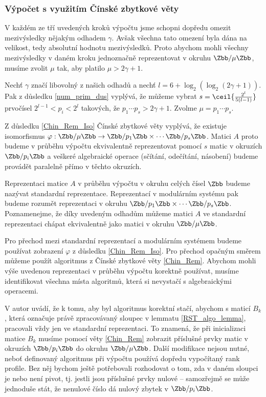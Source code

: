 \subsubsection{Výpočet s využitím Čínské zbytkové věty}

V každém ze tří uvedených kroků výpočtu jsme schopni dopředu omezit mezivýsledky
nějakým odhadem $ \gamma $. Avšak všechna tato omezení byla dána na velikost,
tedy absolutní hodnotu mezivýsledků. Proto abychom mohli všechny mezivýsledky 
v daném kroku jednoznačně reprezentovat v okruhu $ \Zbb / \mu \Zbb $, musíme 
zvolit $ \mu $ tak, aby platilo $ \mu > 2 \gamma + 1 $.

Nechť $ \gamma $ značí libovolný z našich odhadů a nechť 
$ l = 6 + \log_2(\log_2(2 \gamma + 1)) $. Pak z důsledku \ref{num_prim_dus} 
vyplývá, že můžeme vybrat $ s = \ceil{\frac{2^{l}}{5 (l - 1)}} $ prvočísel 
$ 2^{l - 1} < p_i < 2^l $ takových, že $ p_1 \cdots p_s > 2 \gamma + 1 $. Zvolme 
$ \mu = p_1 \cdots p_s $. 

Z důsledku \ref{Chin_Rem_Iso} Čínské zbytkové věty vyplývá, že existuje 
isomorfismus 
$ \varphi : \Zbb / \mu \Zbb \rightarrow \Zbb / p_1 \Zbb \times \cdots \Zbb / p_s \Zbb $.
Matici $ A $ proto budeme v průběhu výpočtu ekvivalentně reprezentovat pomocí
$ s $ matic v okruzích $ \Zbb / p_i \Zbb $ a veškeré algebraické operace 
(sčítání, odečítání, násobení) budeme provádět paralelně přímo v těchto okruzích.

Reprezentaci matice $ A $ v průběhu výpočtu v okruhu celých čísel $ \Zbb $ budeme
nazývat standardní reprezentace. Reprezentací v modulárním systému pak budeme 
rozumět reprezentaci v okruhu $ \Zbb / p_1 \Zbb \times \cdots \Zbb / p_s \Zbb $.
Poznamenejme, že díky uvedeným odhadům můžeme matici $ A $ ve standardní 
reprezentaci chápat ekvivalentně jako matici v okruhu $ \Zbb / \mu \Zbb $. 

Pro přechod mezi standardní reprezentací a modulárním systémem budeme používat
zobrazení $ \varphi $ z důsledku \ref{Chin_Rem_Iso}. Pro přechod opačným směrem
můžeme použít algoritmus z Čínské zbytkové věty \ref{Chin_Rem}.
Abychom mohli výše uvedenou reprezentaci v průběhu výpočtu korektně používat, 
musíme identifikovat všechna místa algoritmů, která si nevystačí s algebraickými 
operacemi. 

V \cite[Theorem 16]{triang} autor uvádí, že k tomu, aby byl algoritmus
korektní stačí, abychom s maticí $ B_k $, která označuje právě zpracovávaný 
sloupec v lemmatu \ref{RST_algo_lemma}, pracovali vždy jen ve standardní 
reprezentaci. To znamená, že při inicializaci matice $ B_k $ musíme pomocí věty 
\ref{Chin_Rem} zobrazit příslušné prvky matic v okruzích $ \Zbb / p_i \Zbb $ do 
okruhu $ \Zbb / \mu \Zbb $. Další modifikace nejsou nutné, neboť definovaný 
algoritmus při výpočtu používá dopředu vypočítaný rank profile. Bez něj bychom 
ještě potřebovali rozhodovat o tom, zda v daném sloupci je nebo není pivot, tj. 
jestli jsou příslušné prvky nulové -- samozřejmě se může jednoduše stát, že 
nenulové číslo dá nulový zbytek v $\Zbb / p_i \Zbb$.

